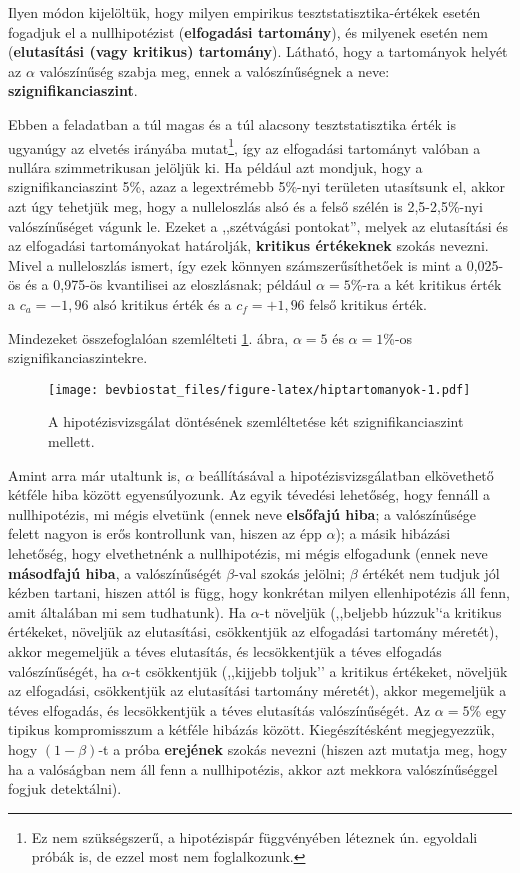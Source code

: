 \documentclass[]{book}
\let\rmarkdownfootnote\footnote%
\def\footnote{\protect\rmarkdownfootnote}
\begin{document}
Ilyen módon kijelöltük, hogy milyen empirikus tesztstatisztika-értékek
esetén fogadjuk el a nullhipotézist (\textbf{elfogadási tartomány}), és
milyenek esetén nem (\textbf{elutasítási (vagy kritikus) tartomány}).
Látható, hogy a tartományok helyét az \(\alpha\) valószínűség szabja
meg, ennek a valószínűségnek a neve: \textbf{szignifikanciaszint}.

Ebben a feladatban a túl magas és a túl alacsony tesztstatisztika érték
is ugyanúgy az elvetés irányába
mutat\footnote{Ez nem szükségszerű, a hipotézispár függvényében léteznek ún. egyoldali próbák is, de ezzel most nem foglalkozunk.},
így az elfogadási tartományt valóban a nullára szimmetrikusan jelöljük
ki. Ha például azt mondjuk, hogy a szignifikanciaszint 5\%, azaz a
legextrémebb 5\%-nyi területen utasítsunk el, akkor azt úgy tehetjük
meg, hogy a nulleloszlás alsó és a felső szélén is 2,5-2,5\%-nyi
valószínűséget vágunk le. Ezeket a ,,szétvágási pontokat'', melyek az
elutasítási és az elfogadási tartományokat határolják, \textbf{kritikus
értékeknek} szokás nevezni. Mivel a nulleloszlás ismert, így ezek
könnyen számszerűsíthetőek is mint a 0,025-ös és a 0,975-ös kvantilisei
az eloszlásnak; például \(\alpha=5\)\%-ra a két kritikus érték a
\(c_a=-1,\!96\) alsó kritikus érték és a \(c_f=+1,\!96\) felső kritikus
érték.

Mindezeket összefoglalóan szemlélteti \ref{fig:hiptartomanyok}. ábra,
\(\alpha=5\) és \(\alpha=1\)\%-os szignifikanciaszintekre.

\begin{figure}
\centering
\texttt{[image: bevbiostat\_files/figure-latex/hiptartomanyok-1.pdf]}
\caption{\label{fig:hiptartomanyok}A hipotézisvizsgálat döntésének
szemléltetése két szignifikanciaszint mellett.}
\end{figure}

Amint arra már utaltunk is, \(\alpha\) beállításával a
hipotézisvizsgálatban elkövethető kétféle hiba között egyensúlyozunk. Az
egyik tévedési lehetőség, hogy fennáll a nullhipotézis, mi mégis
elvetünk (ennek neve \textbf{elsőfajú hiba}; a valószínűsége felett
nagyon is erős kontrollunk van, hiszen az épp \(\alpha\)); a másik
hibázási lehetőség, hogy elvethetnénk a nullhipotézis, mi mégis
elfogadunk (ennek neve \textbf{másodfajú hiba}, a valószínűségét
\(\beta\)-val szokás jelölni; \(\beta\) értékét nem tudjuk jól kézben
tartani, hiszen attól is függ, hogy konkrétan milyen ellenhipotézis áll
fenn, amit általában mi sem tudhatunk). Ha \(\alpha\)-t növeljük
(,,beljebb húzzuk'`a kritikus értékeket, növeljük az elutasítási,
csökkentjük az elfogadási tartomány méretét), akkor megemeljük a téves
elutasítás, és lecsökkentjük a téves elfogadás valószínűségét, ha
\(\alpha\)-t csökkentjük (,,kijjebb toljuk'' a kritikus értékeket,
növeljük az elfogadási, csökkentjük az elutasítási tartomány méretét),
akkor megemeljük a téves elfogadás, és lecsökkentjük a téves elutasítás
valószínűségét. Az \(\alpha=5\)\% egy tipikus kompromisszum a kétféle
hibázás között. Kiegészítésként megjegyezzük, hogy
\(\left(1-\beta\right)\)-t a próba \textbf{erejének} szokás nevezni
(hiszen azt mutatja meg, hogy ha a valóságban nem áll fenn a
nullhipotézis, akkor azt mekkora valószínűséggel fogjuk detektálni).
\end{document}
